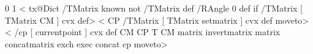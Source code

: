 %
\def\psset@normal#1{%
  \pst@expandafter\psset@@viewpoint#1 {} {} {} \@nil
  \let\psk@normal\pst@tempg}
\psset@normal{0 0 1}
%
\def\psset@embedangle#1{\pst@getangle{#1}\psk@embedangle}
\psset@embedangle{0}
%
<%
  tx@Dict /TMatrix known not { /TMatrix { } def /RAngle { 0 } def } if
  /TMatrix [ TMatrix CM ] cvx def>
<%
  CP /TMatrix [ TMatrix setmatrix ] cvx def moveto>
<%
  \tx@TMSave
  /cp [ currentpoint ] cvx def %
  CM
  CP T \tx@STV
  CM matrix invertmatrix    %
  matrix concatmatrix       %
  exch exec
  concat cp moveto>
%
\def\ThreeDput{\def\pst@par{}\pst@object{ThreeDput}}
\def\ThreeDput@i{\@ifnextchar({\ThreeDput@ii}{\ThreeDput@ii(\z@,\z@,\z@)}}
\def\ThreeDput@ii(#1,#2,#3){%
  \pst@killglue\pst@makebox{\ThreeDput@iii(#1,#2,#3)}}
\def\ThreeDput@iii(#1,#2,#3){%
  \begingroup
    \use@par
    \if@star\pst@starbox\fi
    \pst@makesmall\pst@hbox
    \pssetxlength\pst@dima{#1}%
    \pssetylength\pst@dimb{#2}%
    \pssetzlength\pst@dimc{#3}%
    \leavevmode
    \hbox{%
      \pst@Verb{%
        { \pst@number\pst@dima
          \pst@number\pst@dimb
          \pst@number\pst@dimc
          \psk@normal
          \psk@embedangle
          \psk@viewpoint
          \psk@viewangle
          \tx@SetMatrixEmbed
        } \tx@TMChange}%
    \box\pst@hbox
    \pst@Verb{\tx@TMRestore}}%
  \endgroup
  \ignorespaces}
